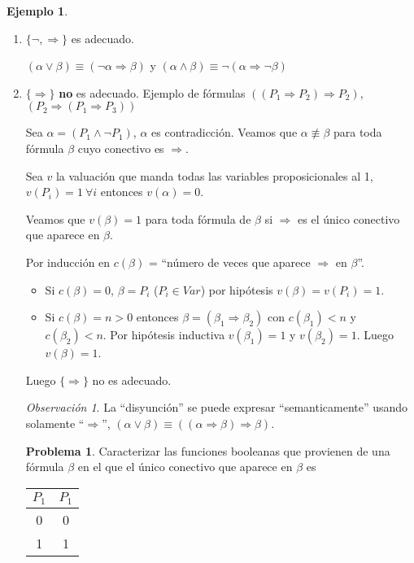 \documentclass[a4paper,11pt]{article}
\theoremstyle{definition}
\newtheorem{exap}{Ejemplo}[section]
\newtheorem*{prob}{Problema}
\theoremstyle{remark}
\newtheorem*{remk}{Observación}
\begin{document}
\begin{exap}
\begin{enumerate}[label=\emph{\alph*})]
\item $\{\neg, \Rightarrow\}$ es adecuado. 

$(\alpha \vee \beta) \equiv (\neg\alpha \Rightarrow \beta)$ y 
$(\alpha \wedge \beta) \equiv \neg(\alpha \Rightarrow \neg\beta)$

\item $\{\Rightarrow\}$ \textbf{no} es adecuado. Ejemplo de fórmulas
$((P_1 \Rightarrow P_2) \Rightarrow P_2)$, 
$(P_2 \Rightarrow (P_1 \Rightarrow P_3))$

Sea $\alpha = (P_1 \wedge \neg P_1)$, $\alpha$ es contradicción. Veamos
que $\alpha \not\equiv \beta$ para toda fórmula $\beta$ cuyo conectivo es
$\Rightarrow$.

Sea $v$ la valuación que manda todas las variables proposicionales al 1,
$v(P_i) = 1\  \forall i$ entonces $v(\alpha) = 0$.

Veamos que $v(\beta) = 1$ para toda fórmula de $\beta$ si $\Rightarrow$
es el único conectivo que aparece en $\beta$.

Por inducción en $c(\beta)$ = ``número de veces que aparece $\Rightarrow$
en $\beta$''.

\begin{itemize}
\item Si $c(\beta) = 0$, $\beta = P_i$ ($P_i \in Var$) por hipótesis
$v(\beta) = v(P_i) = 1$.

\item Si $c(\beta) = n > 0$ entonces $\beta = (\beta_1 \Rightarrow \beta_2)$
con $c(\beta_1) < n$ y $c(\beta_2) < n$. Por hipótesis inductiva
$v(\beta_1) = 1$ y $v(\beta_2) = 1$. Luego $v(\beta) = 1$.
\end{itemize}

Luego $\{\Rightarrow\}$ no es adecuado.

\begin{remk}
La ``disyunción'' se puede expresar ``semanticamente'' usando solamente
``$\Rightarrow$'', $(\alpha \vee \beta) \equiv 
((\alpha \Rightarrow \beta) \Rightarrow \beta)$.
\end{remk}

\begin{prob}
Caracterizar las funciones booleanas que provienen de una fórmula $\beta$
en el que el único conectivo que aparece en $\beta$ es

\begin{tabular}{c|c}
$P_1$ & $P_1$ \\
\hline
0 & 0 \\
1 & 1
\end{tabular}


\end{prob}
\end{enumerate}
\end{exap}
\end{document}
